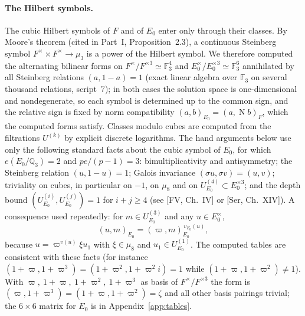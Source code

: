 \documentclass[11pt]{article}
\newcommand{\Q}{\mathbb Q}
\newcommand{\Fq}{\mathbb F}
\newcommand{\Nm}{\operatorname N}
\theoremstyle{plain}
\theoremstyle{definition}
\begin{document}
\paragraph{The Hilbert symbols.}
The cubic Hilbert symbols of $F$ and of $E_0$ enter only through their
classes.  By Moore's theorem (cited in Part~I, Proposition~2.3), a
continuous Steinberg symbol $F^\times\times F^\times\to\mu_3$ is a power of
the Hilbert symbol.  We therefore computed the alternating bilinear
forms on $F^\times/F^{\times3}\simeq\Fq_3^4$ and $E_0^\times/E_0^{\times3}\simeq\Fq_3^6$
annihilated by all Steinberg relations $(a,1-a)=1$ (exact linear
algebra over $\Fq_3$ on several thousand relations, script~7); in both
cases the solution space is one-dimensional and nondegenerate, so each
symbol is determined up to the common sign, and the relative sign is
fixed by norm compatibility $(a,b)_{E_0}=(a,\Nm b)_F$, which the
computed forms satisfy.  Classes modulo cubes are computed from the
filtrations $U^{(k)}$ by explicit discrete logarithms.  The hand
arguments below use only the following standard facts about the cubic
symbol of $E_0$, for which $e(E_0/\Q_3)=2$ and $pe/(p-1)=3$:
bimultiplicativity and antisymmetry; the Steinberg relation
$(u,1-u)=1$; Galois invariance $(\sigma u,\sigma v)=(u,v)$; triviality
on cubes, in particular on $-1$, on $\mu_8$ and on
$U^{(4)}_{E_0}\subset E_0^{\times3}$; and the depth bound
$(U^{(i)}_{E_0},U^{(j)}_{E_0})=1$ for $i+j\ge4$ (see [FV, Ch.~IV] or
[Ser, Ch.~XIV]).  A consequence used repeatedly: for $m\in U^{(3)}_{E_0}$
and any $u\in E_0^\times$,
\begin{equation}\label{eq:level0}
 (u,m)_{E_0}=(\varpi,m)_{E_0}^{\,v_{E_0}(u)},
\end{equation}
because $u=\varpi^{v(u)}\xi u_1$ with $\xi\in\mu_8$ and $u_1\in U^{(1)}_{E_0}$.
The computed tables are consistent with these facts (for instance
$(1+\varpi,1+\varpi^3)=(1+\varpi^2,1+\varpi^2i)=1$ while
$(1+\varpi,1+\varpi^2)\ne1$).  With
$\varpi,\ 1+\varpi,\ 1+\varpi^2,\ 1+\varpi^3$ as basis of $F^\times/F^{\times3}$ the
form is $(\varpi,1+\varpi^3)=(1+\varpi,1+\varpi^2)=\zeta$ and all other basis
pairings trivial; the $6\times6$ matrix for $E_0$ is in
Appendix~\ref{app:tables}.
\end{document}
